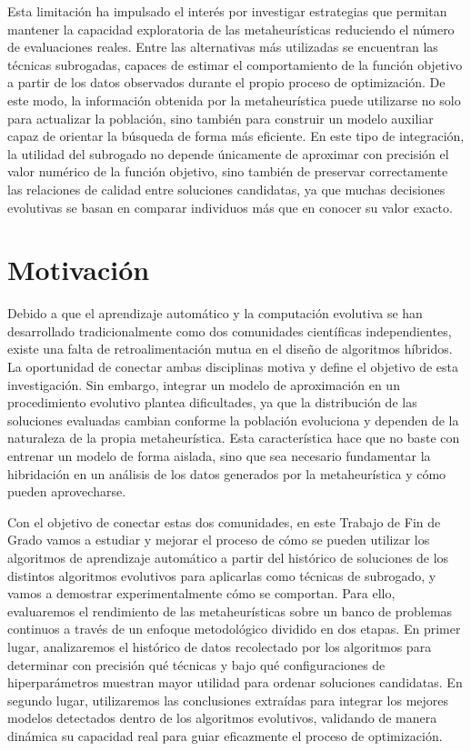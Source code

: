 Esta limitación ha impulsado el interés por investigar estrategias que permitan
mantener la capacidad exploratoria de las metaheurísticas reduciendo el número
de evaluaciones reales. Entre las alternativas más utilizadas se encuentran las
técnicas subrogadas, capaces de estimar el comportamiento de la función objetivo
a partir de los datos observados durante el propio proceso de optimización. De
este modo, la información obtenida por la metaheurística puede utilizarse no
solo para actualizar la población, sino también para construir un modelo
auxiliar capaz de orientar la búsqueda de forma más eficiente. En este tipo de
integración, la utilidad del subrogado no depende únicamente de aproximar con
precisión el valor numérico de la función objetivo, sino también de preservar
correctamente las relaciones de calidad entre soluciones candidatas, ya que
muchas decisiones evolutivas se basan en comparar individuos más que en conocer
su valor exacto.

\section{Motivación}
\label{sec:motivacion}

Debido a que el aprendizaje automático y la computación evolutiva se han desarrollado tradicionalmente como dos comunidades científicas independientes, existe una falta de retroalimentación mutua en el diseño de algoritmos híbridos. La oportunidad de conectar ambas disciplinas motiva y define el objetivo de esta investigación. Sin embargo, integrar un modelo de aproximación en un procedimiento evolutivo plantea dificultades, ya que la distribución de las soluciones evaluadas  cambian conforme la población evoluciona y dependen de la naturaleza de la propia metaheurística. Esta característica hace que no baste con entrenar un modelo de forma aislada, sino que sea necesario fundamentar la hibridación en un análisis de los datos generados por la metaheurística y cómo pueden aprovecharse.

Con el objetivo de conectar estas dos comunidades, en este Trabajo de Fin de Grado vamos a estudiar y mejorar el proceso de cómo se pueden utilizar los algoritmos de aprendizaje automático a partir del histórico de soluciones de los distintos algoritmos evolutivos para aplicarlas como técnicas de subrogado, y vamos a demostrar experimentalmente cómo se comportan.
Para ello, evaluaremos el rendimiento de las metaheurísticas sobre un banco de problemas continuos a través de un enfoque metodológico dividido en dos etapas. En primer lugar, analizaremos el histórico de datos recolectado por los algoritmos para determinar con precisión qué técnicas y bajo qué configuraciones de hiperparámetros muestran mayor utilidad para ordenar soluciones candidatas. En segundo lugar, utilizaremos las conclusiones extraídas para integrar los mejores modelos detectados dentro de los algoritmos evolutivos, validando de manera dinámica su capacidad real para guiar eficazmente el proceso de optimización.

